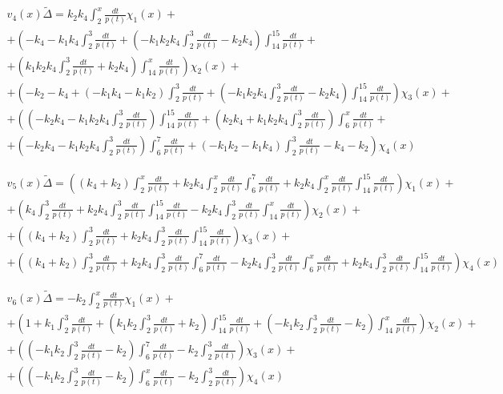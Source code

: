 \documentclass[a4paper,12pt]{article} %
\begin{document}
\begin{multline}
	{v_4(x)}{\tilde{\Delta}}=
	k_2 k_4 \int_{2}^{x}\frac{dt}{p(t)} \chi_1(x)
	+\\+
	\left( -k_4-k_1 k_4 \int_{2}^{3}\frac{dt}{p(t)}+\left( -k_1 k_2 k_4 \int_{2}^{3}\frac{dt}{p(t)}-k_2 k_4\right)  \int_{14}^{15}\frac{dt}{p(t)}
	\right. +\\+ \left.
	\left( k_1 k_2 k_4 \int_{2}^{3}\frac{dt}{p(t)}+k_2 k_4\right)  \int_{14}^{x}\frac{dt}{p(t)}\right)  \chi_2(x)
	+\\+
	\left( -k_2-k_4+\left( -k_1 k_4-k_1 k_2\right)  \int_{2}^{3}\frac{dt}{p(t)}+\left( -k_1 k_2 k_4 \int_{2}^{3}\frac{dt}{p(t)}-k_2 k_4\right)  \int_{14}^{15}\frac{dt}{p(t)}\right)  \chi_3(x)
	+\\+
	\left(\left( -k_2 k_4-k_1 k_2 k_4 \int_{2}^{3}\frac{dt}{p(t)}\right)  \int_{14}^{15}\frac{dt}{p(t)}+\left( k_2 k_4+k_1 k_2 k_4 \int_{2}^{3}\frac{dt}{p(t)}\right)  \int_{6}^{x}\frac{dt}{p(t)}
	\right. +\\+ \left.
	\left( -k_2 k_4-k_1 k_2 k_4 \int_{2}^{3}\frac{dt}{p(t)}\right)  \int_{6}^{7}\frac{dt}{p(t)}+\left( -k_1 k_2-k_1 k_4\right)  \int_{2}^{3}\frac{dt}{p(t)}-k_4-k_2\right)
	\chi_4(x)
\end{multline}

\begin{multline}
	{v_5(x)}{\tilde{\Delta}}=
	\left( \left( k_4+k_2\right)  \int_{2}^{x}\frac{dt}{p(t)}+k_2 k_4 \int_{2}^{x}\frac{dt}{p(t)} \int_{6}^{7}\frac{dt}{p(t)}+k_2 k_4 \int_{2}^{x}\frac{dt}{p(t)} \int_{14}^{15}\frac{dt}{p(t)}\right)  \chi_1(x)
	+\\+
	\left( k_4 \int_{2}^{3}\frac{dt}{p(t)}+k_2 k_4 \int_{2}^{3}\frac{dt}{p(t)} \int_{14}^{15}\frac{dt}{p(t)}-k_2 k_4 \int_{2}^{3}\frac{dt}{p(t)} \int_{14}^{x}\frac{dt}{p(t)}\right)  \chi_2(x)
	+\\+
	\left( \left( k_4+k_2\right)  \int_{2}^{3}\frac{dt}{p(t)}+k_2 k_4 \int_{2}^{3}\frac{dt}{p(t)} \int_{14}^{15}\frac{dt}{p(t)}\right)  \chi_3(x)
	+\\+
	\left( \left( k_4+k_2\right)  \int_{2}^{3}\frac{dt}{p(t)}+k_2 k_4 \int_{2}^{3}\frac{dt}{p(t)} \int_{6}^{7}\frac{dt}{p(t)}-k_2 k_4 \int_{2}^{3}\frac{dt}{p(t)} \int_{6}^{x}\frac{dt}{p(t)}+k_2 k_4 \int_{2}^{3}\frac{dt}{p(t)} \int_{14}^{15}\frac{dt}{p(t)}\right)  \chi_4(x)
\end{multline}

\begin{multline}
	{v_6(x)}{\tilde{\Delta}}=
	-k_2 \int_{2}^{x}\frac{dt}{p(t)} \chi_1(x)
	+\\+
	\left( 1+k_1 \int_{2}^{3}\frac{dt}{p(t)}+\left( k_1 k_2 \int_{2}^{3}\frac{dt}{p(t)}+k_2\right)  \int_{14}^{15}\frac{dt}{p(t)}+\left( -k_1 k_2 \int_{2}^{3}\frac{dt}{p(t)}-k_2\right)  \int_{14}^{x}\frac{dt}{p(t)}\right)  \chi_2(x)
	+\\+
	\left( \left( -k_1 k_2 \int_{2}^{3}\frac{dt}{p(t)}-k_2\right)  \int_{6}^{7}\frac{dt}{p(t)}-k_2 \int_{2}^{3}\frac{dt}{p(t)}\right)  \chi_3(x)
	+\\+
	\left( \left( -k_1 k_2 \int_{2}^{3}\frac{dt}{p(t)}-k_2\right)  \int_{6}^{x}\frac{dt}{p(t)}-k_2 \int_{2}^{3}\frac{dt}{p(t)}\right)  \chi_4(x)
\end{multline}
\end{document}
